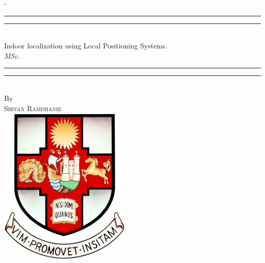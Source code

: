 %
%
% 
%
%
\begin{titlingpage}
\begin{SingleSpace}
\calccentering{\unitlength} 
\begin{adjustwidth*}{\unitlength}{-\unitlength}
\vspace*{13mm}
\begin{center}
\rule[0.5ex]{\linewidth}{2pt}\vspace*{-\baselineskip}\vspace*{3.2pt}
\rule[0.5ex]{\linewidth}{1pt}\\[\baselineskip]
{\HUGE Indoor localization using Local Positioning Systems.}\\[4mm]
{\Large \textit{MSc.}}\\
\rule[0.5ex]{\linewidth}{1pt}\vspace*{-\baselineskip}\vspace{3.2pt}
\rule[0.5ex]{\linewidth}{2pt}\\
\vspace{6.5mm}
{\large By}\\
\vspace{6.5mm}
{\large\textsc{Shivan Ramdhanie}}\\
\vspace{11mm}
\includegraphics[scale=0.6]{logos/bristolcrest_colour}

\end{center}
\end{adjustwidth*}
\end{SingleSpace}
\end{titlingpage}
